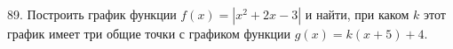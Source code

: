 89. Построить график функции $f(x)=|x^2+2x-3|$ и найти, при каком $k$ этот график имеет три общие точки с графиком функции $g(x)=k(x+5)+4.$\\
